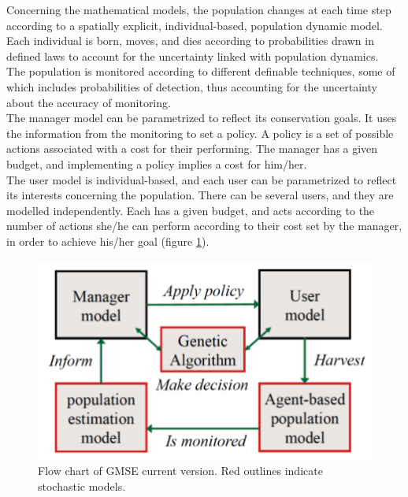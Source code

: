 \documentclass[12pt,a4paper]{article}
\begin{document}
Concerning the mathematical models, the population changes at each time step according to a spatially explicit, individual-based, population dynamic model.
Each individual is born, moves, and dies according to probabilities drawn in defined laws to account for the uncertainty linked with population dynamics.\\
The population is monitored according to different definable techniques, some of which includes probabilities of detection, thus accounting for the uncertainty about the accuracy of monitoring.\\
The manager model can be parametrized to reflect its conservation goals.
It uses the information from the monitoring to set a policy.
A policy is a set of possible actions associated with a cost for their performing.
The manager has a given budget, and implementing a policy implies a cost for him/her.\\
The user model is individual-based, and each user can be parametrized to reflect its interests concerning the population.
There can be several users, and they are modelled independently.
Each has a given budget, and acts according to the number of actions she/he can perform according to their cost set by the manager, in order to achieve his/her goal (figure \ref{gmse-diagram}).
\begin{figure}
	\centering
	\includegraphics[scale=0.35]{gmse-diagram.png}
	\caption{Flow chart of GMSE current version. Red outlines indicate stochastic models.}
	\label{gmse-diagram}
\end{figure}
%
\end{document}
